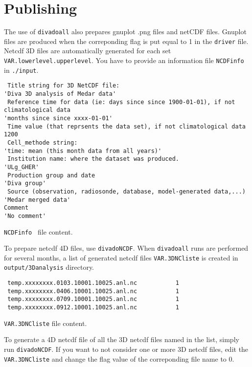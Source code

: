 \documentclass[8pt,a4paper,notitlepage]{book}
\begin{document}
\section{Publishing}

The use of {\tt divadoall} also prepares gnuplot .png files and netCDF files.
Gnuplot files are produced when the correponding flag is put equal to 1 in the {\tt driver} file.
Netcdf 3D files are automatically generated for each set {\tt VAR.lowerlevel.upperlevel}. You have to provide an information file {\tt NCDFinfo} in {\tt ./input}.

\begin{exfile}[H]
\begin{footnotesize}
\begin{verbatim}
 Title string for 3D NetCDF file:
'Diva 3D analysis of Medar data'
 Reference time for data (ie: days since since 1900-01-01), if not climatological data
'months since since xxxx-01-01'
 Time value (that reprsents the data set), if not climatological data
1200
 Cell_methode string:
'time: mean (this month data from all years)'
 Institution name: where the dataset was produced.
'ULg_GHER'
 Production group and date
'Diva group'
 Source (observation, radiosonde, database, model-generated data,...)
'Medar merged data'
Comment
'No comment'
\end{verbatim}
\end{footnotesize}
\caption{{\tt NCDFinfo } file content.} 
\end{exfile}

To prepare netcdf 4D files, use {\tt divadoNCDF}. When {\tt divadoall} runs are performed for several months, a list of generated netcdf files {\tt VAR.3DNCliste} is created in {\tt output/3Danalysis} directory.

\begin{exfile}[H]
\begin{footnotesize}
\begin{verbatim}
 temp.xxxxxxxx.0103.10001.10025.anl.nc           1
 temp.xxxxxxxx.0406.10001.10025.anl.nc           1
 temp.xxxxxxxx.0709.10001.10025.anl.nc           1
 temp.xxxxxxxx.0912.10001.10025.anl.nc           1
\end{verbatim}
\end{footnotesize}
\caption{{\tt VAR.3DNCliste} file content.} 
\end{exfile}

 To generate a 4D netcdf file of all the 3D netcdf files named in the list, simply run {\tt divadoNCDF}. If you want to not consider one or more 3D netcdf files, edit the {\tt VAR.3DNCliste} and change the flag value of the correponding file name to 0.
\end{document}
